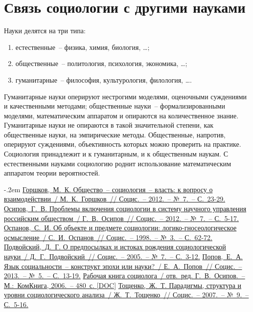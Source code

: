   \section{Связь социологии с другими науками}

    Науки делятся на три типа:
    \begin{enumerate}
      \item естественные~-- физика, химия, биология, \ldots;
      \item общественные~-- политология, психология, экономика, \ldots;
      \item гуманитарные~-- философия, культурология, филология, \ldots.
    \end{enumerate}

    Гуманитарные науки оперируют нестрогими моделями, оценочными суждениями и
    качественными методами; общественные науки~-- формализированными моделями,
    математическим аппаратом и опираются на количественное знание. Гуманитарные
    науки не опираются в такой значительной степени, как общественные науки, на
    эмпирические методы. Общественные, напротив, оперируют суждениями,
    объективность которых можно проверить на практике. Социология принадлежит
    и к гуманитарным, и к общественным наукам. С естественными науками
    социологию роднит использование математическим аппаратом теории
    вероятностей.
    
    \begin{thebibliography}{9}
      \itemsep -.2em
       \href{http://www.isras.ru/files/File/Socis/2012_7/%
        Gorshkov.pdf}{Горшков,~М.~К. Общество~-- социология~-- власть: к
        вопросу о взаимодействии~/ М.~К.~Горшков~// Социс.~-- 2012.~-- №~7.~--
        С.~23-29.}
       \href{http://www.isras.ru/files/File/Socis/2012_7/Osipov.pdf}
        {Осипов,~Г.~В. Проблемы включения социологии в систему научного
        управления российским обществом~/ Г.~В.~Осипов~// Социс.~-- 2012.~--
        №~7.~-- С.~5-17.}
       \href{http://ecsocman.hse.ru/data/580/722/1217/%
        010.OSPANOV.pdf}{Оспанов,~С.~И. Об объекте и предмете социологии:
        логико-гносеологическое осмысление~/ С.~И.~Оспанов~// Социс.~-- 1998.~--
        №~3.~-- С.~62-72.}
       \href{http://www.isras.ru/files/File/Socis/2005-7/%
        podvoyski.pdf}{Подвойский,~Д.~Г. О предпосылках и истоках рождения
        социологической науки~/ Д.~Г.~Подвойский~// Социс.~-- 2005.~-- №~7.~--
        С.~3-12.}
       \href{http://www.isras.ru/files/File/Socis/2013_5/Popov.pdf}
        {Попов,~Е.~А. Язык социальности~-- конструкт эпохи или науки?~/
        Е.~А.~Попов~// Социс.~-- 2013.~-- №~5.~-- С.~13-19.}
       \href{http://vk.cc/2ivPZk}{Рабочая книга социолога~/ отв.~ред.
        Г.~В.~Осипов.~-- М.:~КомКнига, 2006.~-- 480~с. [DOC]}
       \href{http://2008.isras.ru/files/File/Socis/2007-9/%
        toschenko.pdf}{Тощенко,~Ж.~Т. Парадигмы, структура и уровни
        социологического анализа~/ Ж.~Т.~Тощенко~// Социс.~-- 2007.~-- №~9.~--
        С.~5-16.}
    \end{thebibliography}
  
